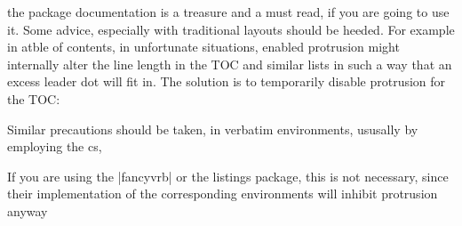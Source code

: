 \begin{multicols}{2}
the package documentation is a treasure and a must read, if you are going to use it. Some advice, especially with traditional layouts should be heeded. For example in atble of contents, in unfortunate
situations, enabled protrusion might internally alter the line length in the TOC and
similar lists in such a way that an excess leader dot will ﬁt in. The solution is to
temporarily disable protrusion for the TOC:

\begin{teXX}
\tableofcontents
{}
\end{teXX}

Similar precautions should be taken, in verbatim environments, ususally by employing the \latex cs,

\begin{teXX}
\g@addto@macro{}
\end{teXX}

If you are using the |fancyvrb| or the listings package, this is not necessary, since
their implementation of the corresponding environments will inhibit protrusion
anyway

\end{multicols}



\clearpage

